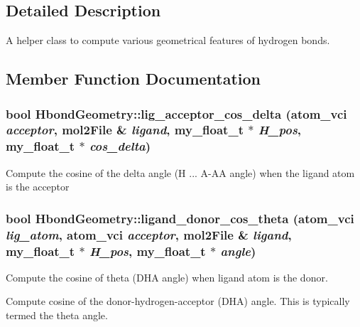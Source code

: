 \subsection{Detailed Description}
A helper class to compute various geometrical features of hydrogen bonds. 



\subsection{Member Function Documentation}
\subsubsection{\setlength{\rightskip}{0pt plus 5cm}bool Hbond\-Geometry::lig\_\-acceptor\_\-cos\_\-delta (atom\_\-vci {\em acceptor}, \bf{mol2File} \& {\em ligand}, my\_\-float\_\-t $\ast$ {\em H\_\-pos}, my\_\-float\_\-t $\ast$ {\em cos\_\-delta})}\label{classASCbase_1_1HbondGeometry_40d1f230f39f08f31cabf8cf239f744a}


Compute the cosine of the delta angle (H ... A-AA angle) when the ligand atom is the acceptor 
\subsubsection{\setlength{\rightskip}{0pt plus 5cm}bool Hbond\-Geometry::ligand\_\-donor\_\-cos\_\-theta (atom\_\-vci {\em lig\_\-atom}, atom\_\-vci {\em acceptor}, \bf{mol2File} \& {\em ligand}, my\_\-float\_\-t $\ast$ {\em H\_\-pos}, my\_\-float\_\-t $\ast$ {\em angle})}\label{classASCbase_1_1HbondGeometry_e9bec32ecce4d5e5d3de550b97a56718}


Compute the cosine of theta (DHA angle) when ligand atom is the donor. 

Compute cosine of the donor-hydrogen-acceptor (DHA) angle. This is typically termed the theta angle. 
